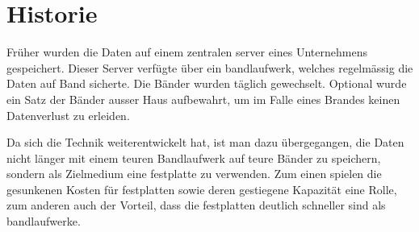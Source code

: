 

\section{Historie}

Früher wurden die Daten auf einem zentralen \gls{server} eines Unternehmens
gespeichert. Dieser Server verfügte über ein \gls{bandlaufwerk}, welches
regelmässig die Daten auf Band sicherte. Die Bänder wurden täglich gewechselt.
Optional wurde ein Satz der Bänder ausser Haus aufbewahrt, um im Falle eines
Brandes keinen Datenverlust zu erleiden.
\bigskip

Da sich die Technik weiterentwickelt hat, ist man dazu übergegangen, die Daten
nicht länger mit einem teuren Bandlaufwerk auf teure Bänder zu speichern,
sondern als Zielmedium eine \gls{festplatte} zu verwenden. Zum einen spielen
die gesunkenen Kosten für \gls{festplatte}n sowie deren gestiegene Kapazität
eine Rolle, zum anderen auch der Vorteil, dass die \gls{festplatte}n deutlich
schneller sind als \gls{bandlaufwerk}e.
\bigskip

